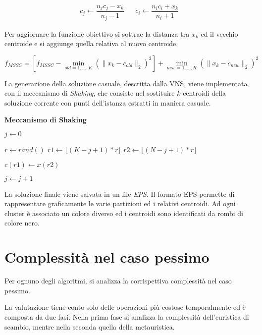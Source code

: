 \documentclass[12pt,a4paper,oneside,hidelinks]{report}
\begin{document}
\begin{align}
  c_j\gets \dfrac{n_jc_j - x_k}{n_j - 1} && c_i\gets \dfrac{n_ic_i + x_k}{n_i + 1}  
\end{align}

Per aggiornare la funzione obiettivo si sottrae la distanza tra $x_k$ ed il vecchio centroide e si aggiunge quella relativa al nuovo centroide.

\begin{equation}
	f_{MSSC} = [f_{MSSC} - \min_{old =1, \dotsc ,K} (\| x_k - c_{old} \|_2)^2] + \min_{new =1, \dotsc ,K} (\| x_k - c_{new} \|_2)^2 
\end{equation} 
 
La generazione della soluzione casuale, descritta dalla VNS, viene implementata con il meccanismo di \textit{Shaking}, che consiste nel sostituire $k$ centroidi della soluzione corrente con punti dell'istanza estratti in maniera casuale.

\begin{algorithm}
\caption{\textbf{Meccanismo di Shaking}}
\begin{algorithmic}[1]
\State $j\gets 0$
\item[]
	\State $r\gets rand()$
	\State $r1\gets \lfloor (K - j + 1) * r \rfloor$
	\State $r2\gets \lfloor (N - j + 1) * r \rfloor$
	\item[]
	\State $c(r1)\gets x(r2)$
	\item[]
	\State $j\gets j + 1$
\EndWhile
\EndFunction
\end{algorithmic}
\end{algorithm}

La soluzione finale viene salvata in un file \textit{EPS}. Il formato EPS permette di rappresentare graficamente le varie partizioni ed i relativi centroidi.
Ad ogni cluster è associato un colore diverso ed i centroidi sono identificati da rombi di colore nero.

\section*{Complessità nel caso pessimo}
Per ognuno degli algoritmi, si analizza la corrispettiva complessità nel caso pessimo.

La valutazione tiene conto solo delle operazioni più costose temporalmente ed è composta da due fasi. Nella prima fase si analizza la complessità dell'euristica di scambio, mentre nella seconda quella della metauristica. 
\end{document}
